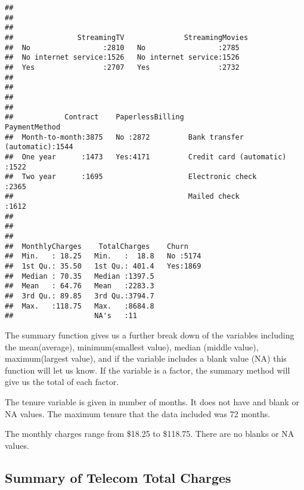 \documentclass[]{article}
\begin{document}
\begin{verbatim}
##                                                        
##                                                        
##                                                        
##               StreamingTV              StreamingMovies
##  No                 :2810   No                 :2785  
##  No internet service:1526   No internet service:1526  
##  Yes                :2707   Yes                :2732  
##                                                       
##                                                       
##                                                       
##                                                       
##            Contract    PaperlessBilling                   PaymentMethod 
##  Month-to-month:3875   No :2872         Bank transfer (automatic):1544  
##  One year      :1473   Yes:4171         Credit card (automatic)  :1522  
##  Two year      :1695                    Electronic check         :2365  
##                                         Mailed check             :1612  
##                                                                         
##                                                                         
##                                                                         
##  MonthlyCharges    TotalCharges    Churn     
##  Min.   : 18.25   Min.   :  18.8   No :5174  
##  1st Qu.: 35.50   1st Qu.: 401.4   Yes:1869  
##  Median : 70.35   Median :1397.5             
##  Mean   : 64.76   Mean   :2283.3             
##  3rd Qu.: 89.85   3rd Qu.:3794.7             
##  Max.   :118.75   Max.   :8684.8             
##                   NA's   :11
\end{verbatim}

The summary function gives us a further break down of the variables
including the mean(average), minimum(smallest value), median (middle
value), maximum(largest value), and if the variable includes a blank
value (NA) this function will let us know. If the variable is a factor,
the summary method will give us the total of each factor.

The tenure variable is given in number of months. It does not have and
blank or NA values. The maximum tenure that the data included was 72
months.

The monthly charges range from \$18.25 to \$118.75. There are no blanks
or NA values.

\subsection{Summary of Telecom Total
Charges}\label{summary-of-telecom-total-charges}
\end{document}
